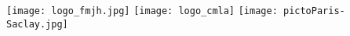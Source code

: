 \documentclass[../thesis]{subfiles}
\begin{document}
\vfill
\noindent
\hbox{\texttt{[image: logo\_fmjh.jpg]}}
\hfill
\hbox{\texttt{[image: logo\_cmla]}}
\hfill \texttt{[image: pictoParis-Saclay.jpg]}
\end{document}
